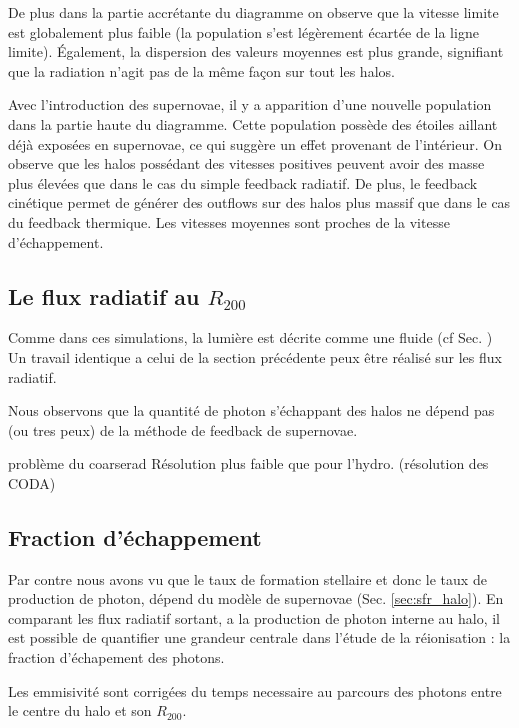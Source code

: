 De plus dans la partie accrétante du diagramme on observe que la vitesse limite est globalement plus faible (la population s'est légèrement écartée de la ligne limite).
Également, la dispersion des valeurs moyennes est plus grande, signifiant que la radiation n'agit pas de la même façon sur tout les halos.

Avec l'introduction des supernovae, il y a apparition d'une nouvelle population dans la partie haute du diagramme.
Cette population possède des étoiles aillant déjà exposées en supernovae, ce qui suggère un effet provenant de l'intérieur.
On observe que les halos possédant des vitesses positives peuvent avoir des masse plus élevées que dans le cas du simple feedback radiatif.
De plus, le feedback cinétique permet de générer des outflows sur des halos plus massif que dans le cas du feedback thermique.
Les vitesses moyennes sont proches de la vitesse d'échappement.

\subsection{Le flux radiatif au $R_{200}$}

Comme dans ces simulations, la lumière est décrite comme une fluide (cf Sec. ) %
Un travail identique a celui de la section précédente peux être réalisé sur les flux radiatif.

Nous observons que la quantité de photon s'échappant des halos ne dépend pas (ou tres peux) de la méthode de feedback de supernovae.

problème du coarserad %
Résolution plus faible que pour l'hydro.
(résolution des CODA)




\subsection{Fraction d'échappement}

Par contre nous avons vu que le taux de formation stellaire et donc le taux de production de photon, dépend du modèle de supernovae (Sec. \ref{sec:sfr_halo}).
En comparant les flux radiatif sortant, a la production de photon interne au halo, il est possible de quantifier une grandeur centrale dans l'étude de la réionisation : la fraction d'échapement des photons.

Les emmisivité sont corrigées du temps necessaire au parcours des photons entre le centre du halo et son $R_{200}$.



